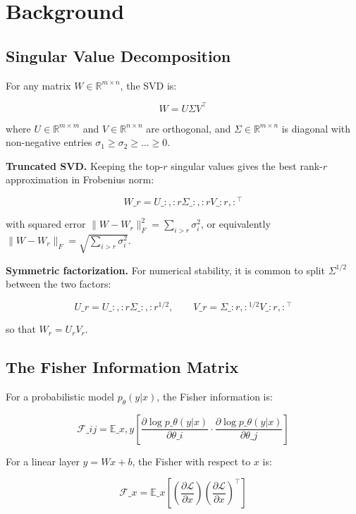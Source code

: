 
\section{Background}

\subsection{Singular Value Decomposition}

For any matrix $W \in \mathbb{R}^{m \times n}$, the SVD is:

\[
W = U \Sigma V^\top
\tag{3.1}
\]

where $U \in \mathbb{R}^{m \times m}$ and $V \in \mathbb{R}^{n \times n}$ are 
orthogonal, and $\Sigma \in \mathbb{R}^{m \times n}$ is diagonal with 
non-negative entries $\sigma_1 \geq \sigma_2 \geq \dots \geq 0$.

\textbf{Truncated SVD.} Keeping the top-$r$ singular values gives the best rank-$r$ 
approximation in Frobenius norm:

\[
W\_r = U\_{:, :r} \Sigma\_{:, :r} V\_{:r, :}^\top
\tag{3.2}
\]

with squared error $\|W - W_r\|_F^2 = \sum_{i > r} \sigma_i^2$, or equivalently $\|W - W_r\|_F = \sqrt{\sum_{i > r} \sigma_i^2}$.

\textbf{Symmetric factorization.} For numerical stability, it is common to split 
$\Sigma^{1/2}$ between the two factors:

\[
U\_r = U\_{:, :r} \Sigma\_{:, :r}^{1/2}, \qquad
V\_r = \Sigma\_{:r, :}^{1/2} V\_{:r, :}^\top
\tag{3.3}
\]

so that $W_r = U_r V_r$.

\subsection{The Fisher Information Matrix}

For a probabilistic model $p_\theta(y | x)$, the Fisher information is:

\[
\mathcal{F}\_{ij} = \mathbb{E}\_{x, y}\!\left[\frac{\partial \log p\_\theta(y | x)}{\partial \theta\_i} \cdot \frac{\partial \log p\_\theta(y | x)}{\partial \theta\_j}\right]
\tag{3.4}
\]

For a linear layer $y = Wx + b$, the Fisher with respect to $x$ is:

\[
\mathcal{F}\_x = \mathbb{E}\_{x}\!\left[\left(\frac{\partial \mathcal{L}}{\partial x}\right) \left(\frac{\partial \mathcal{L}}{\partial x}\right)^\top\right]
\tag{3.5}
\]


